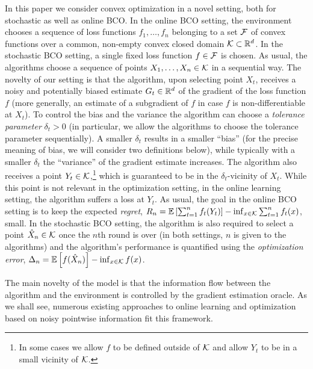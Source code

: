 In this paper we consider convex optimization in a novel setting, both for stochastic as well as online BCO.
In the online BCO setting, the environment chooses a sequence of loss functions $f_1,\dots,f_n$ belonging to a set $\mathcal{F}$ of convex functions over a common, non-empty convex closed domain $\mathcal{K}\subset \mathbb{R}^d$.
In the stochastic BCO setting, a single fixed loss function $f\in \mathcal{F}$ is chosen.
As usual, the algorithms choose a sequence of points $X_1,\dots,X_n\in \mathcal{K}$ in a sequential way.
The novelty of our setting is that the algorithm, upon selecting point $X_t$, receives
a noisy and potentially biased estimate $G_t\in \mathbb{R}^d$
of the gradient of the loss function $f$
(more generally, an estimate of a subgradient of $f$ in case $f$ is non-differentiable at $X_t$).
To control the bias and the variance the algorithm can choose a \emph{tolerance parameter} $\delta_t>0$
(in particular, we allow the algorithms to choose the tolerance parameter sequentially).
A smaller $\delta_t$ results in a smaller ``bias'' (for the precise meaning of bias, we will consider two definitions below), while typically with a smaller $\delta_t$ the ``variance'' of the gradient estimate increases.
The algorithm also receives a point $Y_t\in \mathcal{K}$,\footnote{In some cases we allow $f$ to be defined outside of $\mathcal{K}$ and allow $Y_t$ to be in a small vicinity of $\mathcal{K}$.} which is guaranteed to be in the $\delta_t$-vicinity of $X_t$.
While this point is not relevant in the optimization setting, in the online learning setting,
the algorithm suffers a loss at $Y_t$.
As usual, the goal in the online BCO setting is to keep the expected \emph{regret},
	$R_n =\mathbb{E}\left[ \sum_{t=1}^n f_t(Y_t)\right] - \inf_{x\in \mathcal{K}} \sum_{t=1}^n f_t(x)$,
small.
In the stochastic BCO setting, the algorithm is also required to select a point $\hat{X}_n\in \mathcal{K}$ once
the $n$th round is over (in both settings, $n$ is given to the algorithms)
and the algorithm's performance is quantified using the \emph{optimization error},
$\Delta_n = \mathbb{E}\left[f(\hat{X}_n)\right] - \inf_{x\in \mathcal{K}} f(x) $.

The main novelty of the model is that the information flow between the algorithm and the environment is controlled by the gradient estimation oracle. As we shall see, numerous existing approaches to online learning and optimization based on noisy pointwise information fit this framework.

